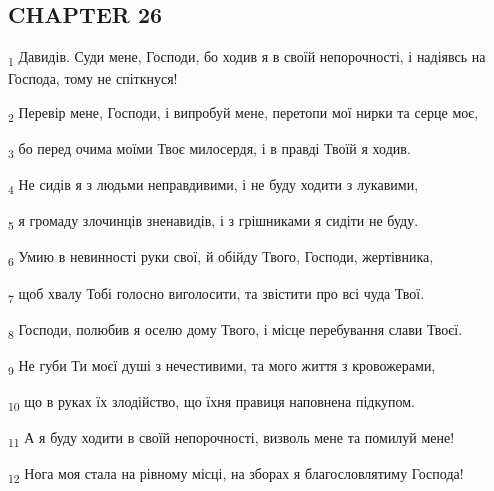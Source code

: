 \subsection{CHAPTER 26}
\begin{tcolorbox}
\textsubscript{1} Давидів. Суди мене, Господи, бо ходив я в своїй непорочності, і надіявсь на Господа, тому не спіткнуся!
\end{tcolorbox}
\begin{tcolorbox}
\textsubscript{2} Перевір мене, Господи, і випробуй мене, перетопи мої нирки та серце моє,
\end{tcolorbox}
\begin{tcolorbox}
\textsubscript{3} бо перед очима моїми Твоє милосердя, і в правді Твоїй я ходив.
\end{tcolorbox}
\begin{tcolorbox}
\textsubscript{4} Не сидів я з людьми неправдивими, і не буду ходити з лукавими,
\end{tcolorbox}
\begin{tcolorbox}
\textsubscript{5} я громаду злочинців зненавидів, і з грішниками я сидіти не буду.
\end{tcolorbox}
\begin{tcolorbox}
\textsubscript{6} Умию в невинності руки свої, й обійду Твого, Господи, жертівника,
\end{tcolorbox}
\begin{tcolorbox}
\textsubscript{7} щоб хвалу Тобі голосно виголосити, та звістити про всі чуда Твої.
\end{tcolorbox}
\begin{tcolorbox}
\textsubscript{8} Господи, полюбив я оселю дому Твого, і місце перебування слави Твоєї.
\end{tcolorbox}
\begin{tcolorbox}
\textsubscript{9} Не губи Ти моєї душі з нечестивими, та мого життя з кровожерами,
\end{tcolorbox}
\begin{tcolorbox}
\textsubscript{10} що в руках їх злодійство, що їхня правиця наповнена підкупом.
\end{tcolorbox}
\begin{tcolorbox}
\textsubscript{11} А я буду ходити в своїй непорочності, визволь мене та помилуй мене!
\end{tcolorbox}
\begin{tcolorbox}
\textsubscript{12} Нога моя стала на рівному місці, на зборах я благословлятиму Господа!
\end{tcolorbox}
